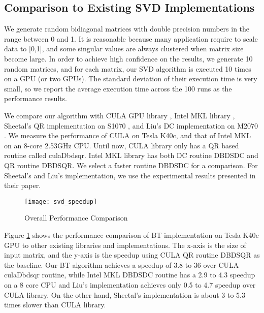 \vspace{-0.1in}
\subsection{Comparison to Existing SVD Implementations}
\vspace{-0.1in}
We generate random bidiagonal matrices with double precision numbers in the range between 0 and 1.
It is reasonable because many application require to scale data to [0,1], and some singular values are always clustered when matrix size become large.
In order to achieve high confidence on the results, we generate 10 random matrices, and for each matrix, our SVD algorithm is executed 10 times on a GPU (or two GPUs).
The standard deviation of their execution time is very small, so we report the average execution time across the 100 runs as the performance results.

We compare our algorithm with CULA GPU library \cite{cula}, Intel MKL library \cite{mkl}, Sheetal's QR implementation on S1070 \cite{09IPDPSQR}, and Liu's DC implementation on M2070 \cite{13CFDC}.
We measure the performance of CULA on Tesla K40c, and that of Intel MKL on an 8-core 2.53GHz CPU.
Until now, CULA library only has a QR based routine called culaDbdsqr.
Intel MKL library has both DC routine DBDSDC and QR routine DBDSQR. We select a faster routine DBDSDC for a comparison.
For Sheetal's \cite{09IPDPSQR} and Liu's \cite{13CFDC} implementation, we use the experimental results presented in their paper. 

\begin{figure}[hbpt]
\vspace{-0.3in}
\centering
\texttt{[image: svd\_speedup]}
\vspace{-0.1in}
\caption{Overall Performance Comparison}
\label{fig:svd_speedup}
\vspace{-0.3in}
\end{figure}
Figure \ref{fig:svd_speedup} shows the performance comparison of BT
implementation on Tesla K40c GPU to other existing libraries
and implementations.
The x-axis is the size of input matrix, and the y-axis is the speedup
using CULA QR routine DBDSQR as the baseline.
Our BT algorithm achieves a speedup of 3.8 to 36 over CULA culaDbdsqr routine,
while Intel MKL DBDSDC routine has a 2.9 to 4.3 speedup on a 8 core CPU and Liu's implementation achieves only 0.5 to 4.7 speedup over CULA library.
On the other hand, Sheetal's implementation is about 3 to 5.3 times slower than CULA library.

